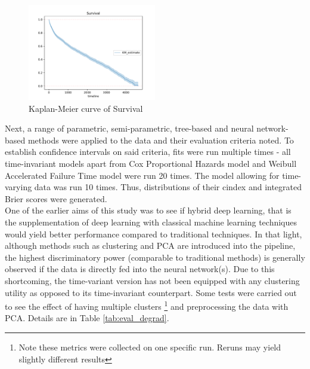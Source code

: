 \documentclass[%
 reprint,
 amsmath,amssymb,
 aps,nofootinbib
]{revtex4-2}
\begin{document}
\begin{figure}[H]
  \centering
  \includegraphics[width=0.5\textwidth]{km_curve.pdf}
  \caption{Kaplan-Meier curve of Survival}
  \label{fig:km_curve}
\end{figure}

Next, a range of parametric, semi-parametric, tree-based and neural network-based methods were applied to the data and their evaluation criteria noted. To establish confidence intervals on said criteria, fits were run multiple times - all time-invariant models apart from Cox Proportional Hazards model and Weibull Accelerated Failure Time model were run 20 times. The model allowing for time-varying data was run 10 times. Thus, distributions of their cindex and integrated Brier scores were generated. \\

One of the earlier aims of this study was to see if hybrid deep learning, that is the supplementation of deep learning with classical machine learning techniques would yield better performance compared to traditional techniques. In that light, although methods such as clustering and PCA are introduced into the pipeline, the highest discriminatory power (comparable to traditional methods) is generally observed if the data is directly fed into the neural network(s). Due to this shortcoming, the time-variant version has not been equipped with any clustering utility as opposed to its time-invariant counterpart. Some tests were carried out to see the effect of having multiple clusters \footnote{Note these metrics were collected on one specific run. Reruns may yield slightly different results} and preprocessing the data with PCA. Details are in Table \ref{tab:eval_degrad}.
\end{document}
